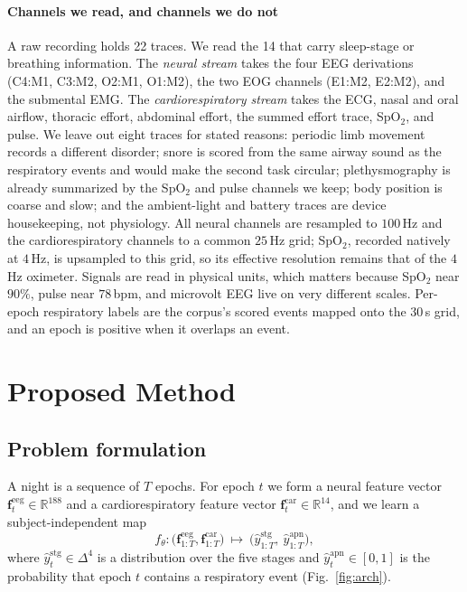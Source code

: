 \documentclass[preprint,12pt]{elsarticle}
\begin{document}
\paragraph{Channels we read, and channels we do not}
A raw recording holds 22 traces. We read the 14 that carry sleep-stage or breathing
information. The \emph{neural stream} takes the four EEG derivations (C4:M1, C3:M2, O2:M1,
O1:M2), the two EOG channels (E1:M2, E2:M2), and the submental EMG. The
\emph{cardiorespiratory stream} takes the ECG, nasal and oral airflow, thoracic effort,
abdominal effort, the summed effort trace, SpO$_2$, and pulse. We leave out eight traces for
stated reasons: periodic limb movement records a different disorder; snore is scored from the
same airway sound as the respiratory events and would make the second task circular;
plethysmography is already summarized by the SpO$_2$ and pulse channels we keep; body position
is coarse and slow; and the ambient-light and battery traces are device housekeeping, not
physiology. All neural channels are resampled to $100$\,Hz and the cardiorespiratory channels
to a common $25$\,Hz grid; SpO$_2$, recorded natively at $4$\,Hz, is upsampled to this grid, so
its effective resolution remains that of the $4$\,Hz oximeter. Signals are read in physical
units, which matters because SpO$_2$ near $90\%$,
pulse near $78$\,bpm, and microvolt EEG live on very different scales. Per-epoch respiratory
labels are the corpus's scored events mapped onto the $30$\,s grid, and an epoch is positive
when it overlaps an event.

\section{Proposed Method}
\label{sec:method}
\subsection{Problem formulation}
A night is a sequence of $T$ epochs. For epoch $t$ we form a neural feature vector
$\mathbf{f}^{\mathrm{eeg}}_t\in\mathbb{R}^{188}$ and a cardiorespiratory feature vector
$\mathbf{f}^{\mathrm{car}}_t\in\mathbb{R}^{14}$, and we learn a subject-independent map
\begin{equation}
f_\theta:\big(\mathbf{f}^{\mathrm{eeg}}_{1:T},\mathbf{f}^{\mathrm{car}}_{1:T}\big)\ \longmapsto\
\big(\hat y^{\mathrm{stg}}_{1:T},\ \hat y^{\mathrm{apn}}_{1:T}\big),
\end{equation}
where $\hat y^{\mathrm{stg}}_t\in\Delta^4$ is a distribution over the five stages and
$\hat y^{\mathrm{apn}}_t\in[0,1]$ is the probability that epoch $t$ contains a respiratory
event (Fig.~\ref{fig:arch}).
\end{document}
